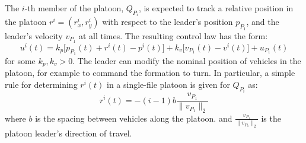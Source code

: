 The $i$-th member of the platoon, $Q_{P_i}$, is expected to track a relative position in the platoon $r^i = (r_x^i,r_y^i)$ with respect to the leader's position $p_{P_1}$, and the leader's velocity $v_{P_1}$ at all times. The resulting control law has the form:
\begin{equation}\label{eq:follow}
u^i(t) = k_p \big[p_{P_1}(t) + r^i(t) - p^i(t) \big] + k_v\big[v_{P_1}(t) - v^i(t)\big] + u_{P_1}(t)
\end{equation}
for some $k_p,k_v>0$. The leader can modify the nominal position of vehicles in the platoon, for example to command the formation to turn. In particular, a simple rule for determining $r^i(t)$ in a single-file platoon is given for $Q_{P_i}$ as:
\begin{equation}\label{eq:nominal_pos}
r^i(t) = - (i-1) b \frac{v_{P_1}}{\|v_{P_1}\|_2}
\end{equation}
where $b$ is the spacing between vehicles along the platoon. and $\frac{v_{P_1}}{\|v_{P_1}\|_2}$ is the platoon leader's direction of travel.